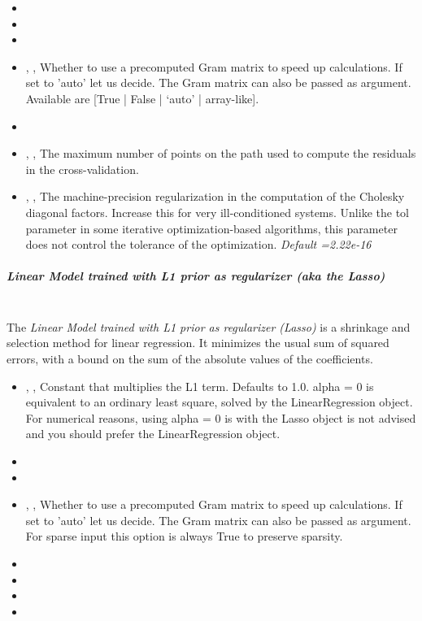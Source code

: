 \begin{itemize}
  \item {}
  \item \verDescriptionA
  \item {}
  \item {} , ,
  Whether to use a precomputed Gram matrix to speed up calculations.
  If set to 'auto' let us decide.
  The Gram matrix can also be passed as argument.
  Available are [True | False | ‘auto’ | array-like].
  \item {}
  \item {}, ,
  The maximum number of points on the path used to compute the residuals in the
  cross-validation.
  \item {} , ,
  The machine-precision regularization in the computation of the Cholesky
  diagonal factors.
  Increase this for very ill-conditioned systems.
  Unlike the tol parameter in some iterative optimization-based algorithms, this
  parameter does not control the tolerance of the optimization.
  \textit{Default =2.22e-16}
\end{itemize}
\subparagraph{Linear Model trained with L1 prior as regularizer (aka the Lasso)}
\mbox{}
\\The \textit{Linear Model trained with L1 prior as regularizer (Lasso)} is a
shrinkage and selection method for linear regression.
%
It minimizes the usual sum of squared errors, with a bound on the sum of the
absolute values of the coefficients.
%
\begin{itemize}
  \item {} , ,
  Constant that multiplies the L1 term.
  Defaults to 1.0.
  alpha = 0 is equivalent to an ordinary least square, solved by the
  LinearRegression object.
  For numerical reasons, using alpha = 0 is with the Lasso object is not advised
  and you should prefer the LinearRegression object.
  \item {}
  \item {}
  \item {} , ,
  Whether to use a precomputed Gram matrix to speed up calculations.
  If set to 'auto' let us decide.
  The Gram matrix can also be passed as argument.
  For sparse input this option is always True to preserve sparsity.
  \item \maxIterDescription{}
  \item {}
  \item \warmStartDescription{}
  \item \positiveDescription{}
\end{itemize}

